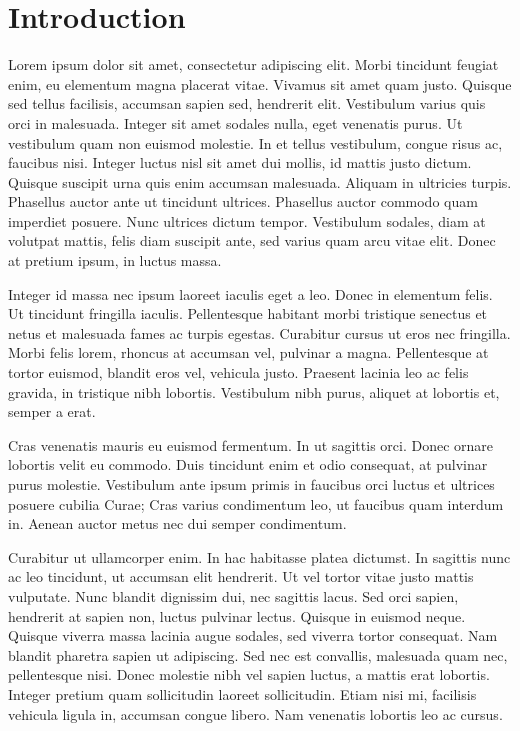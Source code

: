 \chapter{Introduction}

Lorem ipsum dolor sit amet, consectetur adipiscing elit. Morbi tincidunt feugiat enim, eu elementum magna placerat vitae. Vivamus sit amet quam justo. Quisque sed tellus facilisis, accumsan sapien sed, hendrerit elit. Vestibulum varius quis orci in malesuada. Integer sit amet sodales nulla, eget venenatis purus. Ut vestibulum quam non euismod molestie. In et tellus vestibulum, congue risus ac, faucibus nisi. Integer luctus nisl sit amet dui mollis, id mattis justo dictum. Quisque suscipit urna quis enim accumsan malesuada. Aliquam in ultricies turpis. Phasellus auctor ante ut tincidunt ultrices. Phasellus auctor commodo quam imperdiet posuere. Nunc ultrices dictum tempor. Vestibulum sodales, diam at volutpat mattis, felis diam suscipit ante, sed varius quam arcu vitae elit. Donec at pretium ipsum, in luctus massa.

Integer id massa nec ipsum laoreet iaculis eget a leo. Donec in elementum felis. Ut tincidunt fringilla iaculis. Pellentesque habitant morbi tristique senectus et netus et malesuada fames ac turpis egestas. Curabitur cursus ut eros nec fringilla. Morbi felis lorem, rhoncus at accumsan vel, pulvinar a magna. Pellentesque at tortor euismod, blandit eros vel, vehicula justo. Praesent lacinia leo ac felis gravida, in tristique nibh lobortis. Vestibulum nibh purus, aliquet at lobortis et, semper a erat.

Cras venenatis mauris eu euismod fermentum. In ut sagittis orci. Donec ornare lobortis velit eu commodo. Duis tincidunt enim et odio consequat, at pulvinar purus molestie. Vestibulum ante ipsum primis in faucibus orci luctus et ultrices posuere cubilia Curae; Cras varius condimentum leo, ut faucibus quam interdum in. Aenean auctor metus nec dui semper condimentum.

Curabitur ut ullamcorper enim. In hac habitasse platea dictumst. In sagittis nunc ac leo tincidunt, ut accumsan elit hendrerit. Ut vel tortor vitae justo mattis vulputate. Nunc blandit dignissim dui, nec sagittis lacus. Sed orci sapien, hendrerit at sapien non, luctus pulvinar lectus. Quisque in euismod neque. Quisque viverra massa lacinia augue sodales, sed viverra tortor consequat. Nam blandit pharetra sapien ut adipiscing. Sed nec est convallis, malesuada quam nec, pellentesque nisi. Donec molestie nibh vel sapien luctus, a mattis erat lobortis. Integer pretium quam sollicitudin laoreet sollicitudin. Etiam nisi mi, facilisis vehicula ligula in, accumsan congue libero. Nam venenatis lobortis leo ac cursus.

